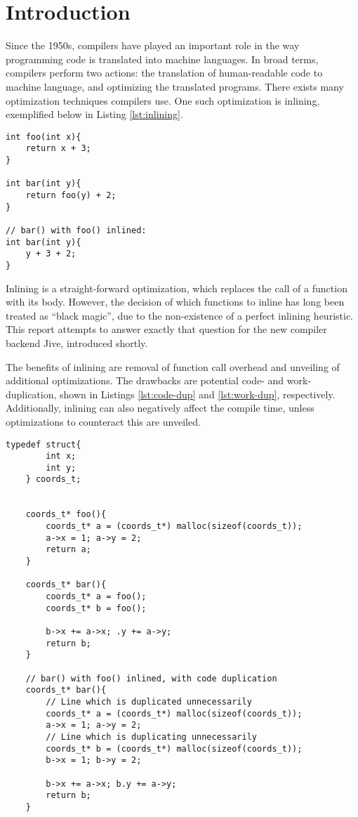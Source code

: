 
\section{Introduction}
\label{introduction}

Since the 1950s, compilers have played an important role in the way programming
code is translated into machine languages. In broad terms, compilers perform two
actions: the translation of human-readable code to machine language, and
optimizing the translated programs. There exists many optimization techniques
compilers use. One such optimization is inlining, exemplified below in Listing
\ref{lst:inlining}.

\begin{lstlisting}[label={lst:inlining}, style=customcpp,
caption={Function \textit{foo()} inlined into function \textit{bar()}.}]
int foo(int x){
	return x + 3;
}

int bar(int y){
	return foo(y) + 2;
}

// bar() with foo() inlined:
int bar(int y){
	y + 3 + 2;
}
\end{lstlisting}

Inlining is a straight-forward optimization, which replaces the call of a
function with its body. However, the decision of which functions to inline has
long been treated as ``black magic'', due to the non-existence of a perfect
inlining heuristic. This report attempts to answer exactly that question for the
new compiler backend Jive, introduced shortly.

The benefits of inlining are removal of function call overhead and unveiling of
additional optimizations. The drawbacks are potential code- and work-
duplication, shown in Listings \ref{lst:code-dup} and \ref{lst:work-dup},
respectively. Additionally, inlining can also negatively affect the compile
time, unless optimizations to counteract this are unveiled.

\begin{lstlisting}[label={lst:code-dup}, style=customcpp,
caption={Code duplication in \textit{bar()}, when inlining \textit{foo()} into
\textit{bar()}.}]
	typedef struct{
		int x;
		int y;
	} coords_t;


	coords_t* foo(){
		coords_t* a = (coords_t*) malloc(sizeof(coords_t));
		a->x = 1; a->y = 2;
		return a;
	}

	coords_t* bar(){
		coords_t* a = foo();
		coords_t* b = foo();

		b->x += a->x; .y += a->y;
		return b;
	}

	// bar() with foo() inlined, with code duplication
	coords_t* bar(){
		// Line which is duplicated unnecessarily
		coords_t* a = (coords_t*) malloc(sizeof(coords_t));
		a->x = 1; a->y = 2;
		// Line which is duplicating unnecessarily
		coords_t* b = (coords_t*) malloc(sizeof(coords_t));
		b->x = 1; b->y = 2;

		b->x += a->x; b.y += a->y;
		return b;
	}
\end{lstlisting}

